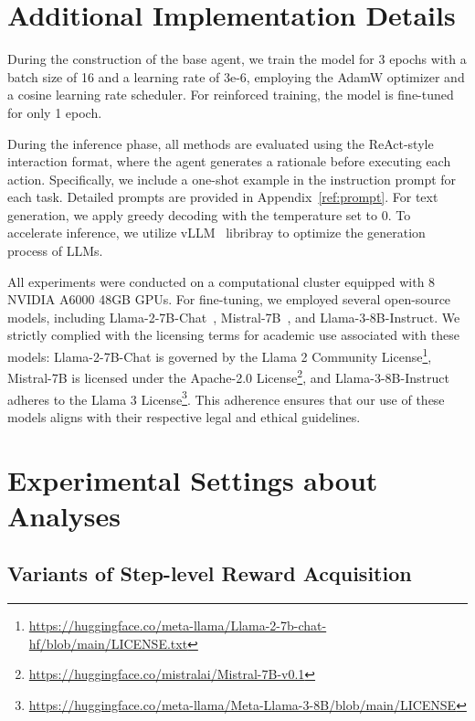 \section{Additional Implementation Details}
\label{appendix:implement}

During the construction of the base agent, we train the model for 3 epochs with a batch size of 16 and a learning rate of 3e-6, employing the AdamW optimizer and a cosine learning rate scheduler. For reinforced training, the model is fine-tuned for only 1 epoch.

During the inference phase, all methods are evaluated using the ReAct-style interaction format, where the agent generates a rationale before executing each action. Specifically, we include a one-shot example in the instruction prompt for each task. Detailed prompts are provided in Appendix~\ref{ref:prompt}. For text generation, we apply greedy decoding with the temperature set to 0. To accelerate inference, we utilize vLLM~\citep{kwon2023efficient} libribray to optimize the generation process of LLMs. 

All experiments were conducted on a computational cluster equipped with 8 NVIDIA A6000 48GB GPUs. For fine-tuning, we employed several open-source models, including Llama-2-7B-Chat~\citep{touvron2023llama}, Mistral-7B~\citep{jiang2023mistral}, and Llama-3-8B-Instruct. We strictly complied with the licensing terms for academic use associated with these models: Llama-2-7B-Chat is governed by the Llama 2 Community License\footnote{\url{https://huggingface.co/meta-llama/Llama-2-7b-chat-hf/blob/main/LICENSE.txt}}, Mistral-7B is licensed under the Apache-2.0 License\footnote{\url{https://huggingface.co/mistralai/Mistral-7B-v0.1}}, and Llama-3-8B-Instruct adheres to the Llama 3 License\footnote{\url{https://huggingface.co/meta-llama/Meta-Llama-3-8B/blob/main/LICENSE}}. This adherence ensures that our use of these models aligns with their respective legal and ethical guidelines.

\section{Experimental Settings about Analyses}
\label{appendix:analysis}

\subsection{Variants of Step-level Reward Acquisition}
\label{appendix:reward_analysis}

